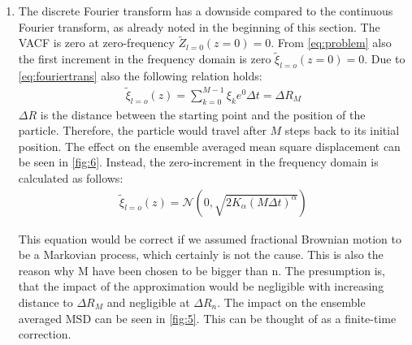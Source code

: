\documentclass[
  a4paper,BCOR10mm,oneside,
  headsepline,footsepline,%
  fleqn,openbib
]{scrbook}
\begin{document}
\begin{enumerate}
 \item The discrete Fourier transform has a downside compared to the continuous Fourier transform, as already noted in the beginning of this section. The VACF is zero at zero-frequency $ \tilde{Z}_{l=0}(z=0)=0$.  From \cref{eq:problem} also the first increment in the frequency domain is zero $ \tilde{\xi}_{l=o}(z=0)= 0$. Due to \cref{eq:fouriertrans} also the following relation holds:
 \begin{align}
   \tilde{\xi}_{l=o}(z) = \sum_{k=0}^{M-1} \xi_k e^{0} \Delta t = \Delta  R_{M} \label{correction}
 \end{align}
$\Delta R $ is the distance between the starting point and the position of the particle. Therefore, the particle would travel after $M$ steps back to its initial position. The effect on the ensemble averaged mean square displacement can be seen in \cref{fig:6}. Instead, the zero-increment in the frequency domain is calculated as follows:
\begin{align}
 \tilde{\xi}_{l=o}(z) = \mathcal{N}(0,\sqrt{2 K_{\alpha} (M \Delta t)^\alpha})
\end{align}

\begin{figure}
\end{figure}
This equation would be correct if we assumed fractional Brownian motion to be a Markovian process, which certainly is not the cause. This is also the reason why M have been chosen to be bigger than n. The presumption is, that the impact of the approximation would be negligible with increasing distance to $\Delta R_{M}$ and negligible at $\Delta R_{n}$. The impact on the ensemble averaged MSD can be seen in \cref{fig:5}. This can be thought of as a finite-time correction.


\end{enumerate}
\end{document}
